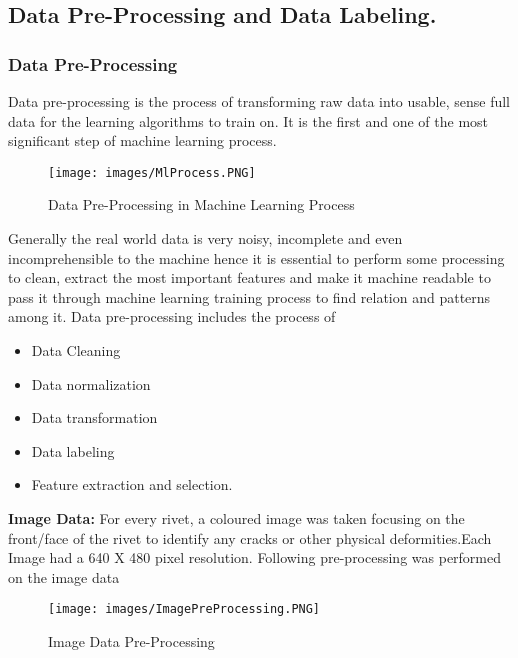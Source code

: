 \documentclass{article}
\begin{document}
\subsection{Data Pre-Processing and Data Labeling.}

\subsubsection{Data Pre-Processing}

Data pre-processing is the process of transforming raw data into usable, sense full data for the learning algorithms to train on. It is the first and one of the most significant step of machine learning process.\\

\begin{figure}[H]
    \centering
    \texttt{[image: images/MlProcess.PNG]}
    \caption{Data Pre-Processing in Machine Learning Process}
    
    \author{David Chappel}
    \label{fig: machineLearningProcess}
\end{figure}

Generally the real world data is very noisy, incomplete and even incomprehensible to the machine hence it is essential to perform some processing to clean, extract the most important features and make it machine readable to pass it through machine learning training process to find relation and patterns among it. Data pre-processing includes the process of \cite{Kotsiantis06datapreprocessing}

\begin{itemize}
 
    \item Data Cleaning
    \item Data normalization
    \item Data transformation
    \item Data labeling
    \item Feature extraction and selection.
    \end{itemize}

\textbf{Image Data: }
For every rivet, a coloured image was taken focusing on the front/face of the rivet to identify any cracks or other physical deformities.Each Image had a 640 X 480 pixel resolution. Following pre-processing was performed on the image data\\

\begin{figure}[H]
    \centering
    \texttt{[image: images/ImagePreProcessing.PNG]}
    \caption{Image Data Pre-Processing}
    \label{fig: ImageDataPreprocessing}
\end{figure}
\end{document}
